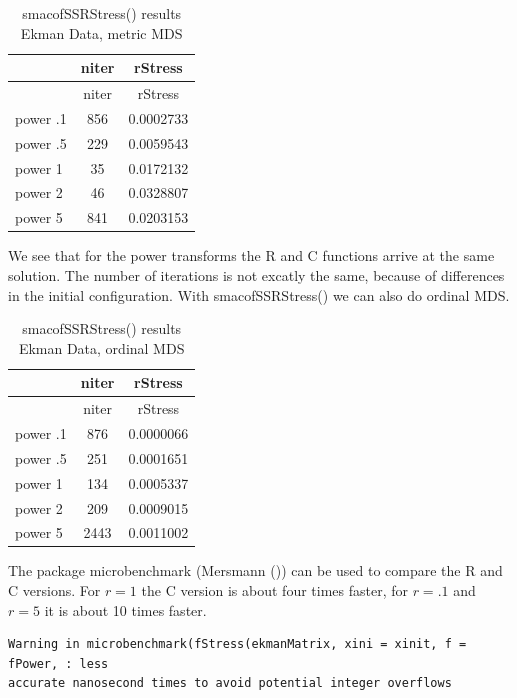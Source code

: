 \documentclass[
  12pt,
  letterpaper,
  DIV=11,
  numbers=noendperiod]{scrartcl}
\begin{document}
\begin{longtable}[]{@{}lcc@{}}
\caption{smacofSSRStress() results Ekman Data, metric
MDS}\tabularnewline
\toprule\noalign{}
& niter & rStress \\
\midrule\noalign{}
\endfirsthead
\toprule\noalign{}
& niter & rStress \\
\midrule\noalign{}
\endhead
\bottomrule\noalign{}
\endlastfoot
power .1 & 856 & 0.0002733 \\
power .5 & 229 & 0.0059543 \\
power 1 & 35 & 0.0172132 \\
power 2 & 46 & 0.0328807 \\
power 5 & 841 & 0.0203153 \\
\end{longtable}

We see that for the power transforms the R and C functions arrive at the
same solution. The number of iterations is not excatly the same, because
of differences in the initial configuration. With smacofSSRStress() we
can also do ordinal MDS.

\begin{longtable}[]{@{}lcc@{}}
\caption{smacofSSRStress() results Ekman Data, ordinal
MDS}\tabularnewline
\toprule\noalign{}
& niter & rStress \\
\midrule\noalign{}
\endfirsthead
\toprule\noalign{}
& niter & rStress \\
\midrule\noalign{}
\endhead
\bottomrule\noalign{}
\endlastfoot
power .1 & 876 & 0.0000066 \\
power .5 & 251 & 0.0001651 \\
power 1 & 134 & 0.0005337 \\
power 2 & 209 & 0.0009015 \\
power 5 & 2443 & 0.0011002 \\
\end{longtable}

The package microbenchmark (Mersmann ())
can be used to compare the R and C versions. For \(r=1\) the C version
is about four times faster, for \(r=.1\) and \(r=5\) it is about 10
times faster.

\begin{verbatim}
Warning in microbenchmark(fStress(ekmanMatrix, xini = xinit, f = fPower, : less
accurate nanosecond times to avoid potential integer overflows
\end{verbatim}
\end{document}
